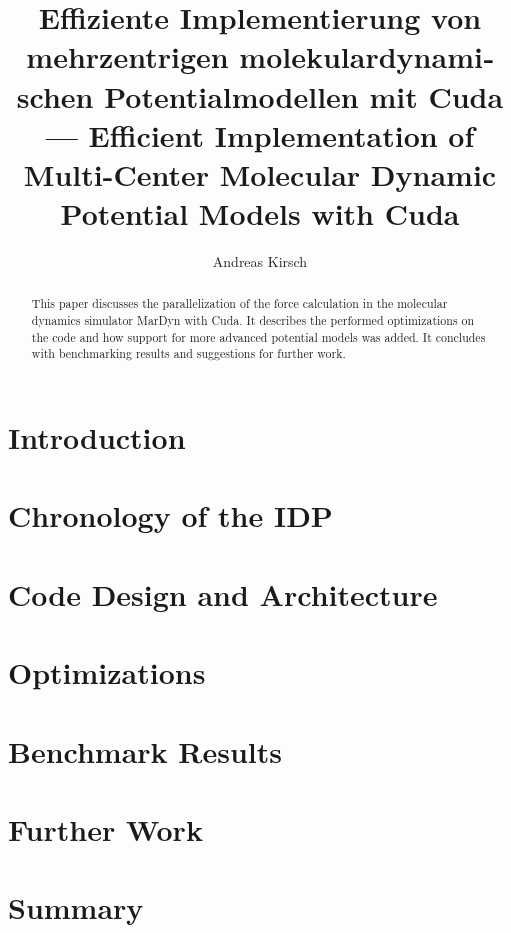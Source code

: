 \documentclass[11pt,a4paper,onecolumn,notitlepage]{scrartcl}
\author{Andreas Kirsch}
\title{\foreignlanguage{ngerman}{Effiziente Implementierung von mehrzentrigen molekulardynamischen Potentialmodellen mit Cuda} \linebreak --- \linebreak Efficient Implementation of Multi-Center Molecular Dynamic Potential Models with Cuda}
\newcommand{\cuda}{Cuda}
\begin{document}
\maketitle

\begin{abstract}
This paper discusses the parallelization of the force calculation in the molecular dynamics simulator MarDyn with \cuda. It describes the performed optimizations on the code and how support for more advanced potential models was added. It concludes with benchmarking results and suggestions for further work.
\end{abstract}

\section{Introduction}



\section{Chronology of the IDP}



\section{Code Design and Architecture}



\section{Optimizations}



\section{Benchmark Results}



\section{Further Work}



\section{Summary}


\end{document}

